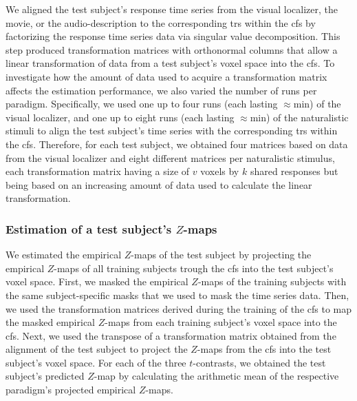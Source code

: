 
%
We aligned the test subject's response time series from the visual localizer,
the movie, or the audio-description to the corresponding \acp{tr} within the
\ac{cfs} by factorizing the response time series data via singular value
decomposition.
%
This step produced transformation matrices with orthonormal columns that allow a
linear transformation of data from a test subject's voxel space into the
\ac{cfs}.
%
To investigate how the amount of data used to acquire a transformation matrix
affects the estimation performance, we also varied the number of runs per
paradigm.
%
Specifically, we used
%
one up to four runs (each lasting $\approx$\unit[5]{min}) of the visual
localizer, and
%
one up to eight runs (each lasting $\approx$\unit[15]{min}) of the naturalistic
stimuli
%
to align the test subject's time series with the corresponding \acp{tr} within
the \ac{cfs}.
%
Therefore, for each test subject, we obtained four matrices based on data from
the visual localizer and eight different matrices per naturalistic stimulus,
each transformation matrix having a size of $v$ voxels by $k$ shared responses
but being based on an increasing amount of data used to calculate the linear
transformation.


\subsubsection{Estimation of a test subject's $Z$-maps}

We estimated the empirical $Z$-maps of the test subject by projecting the
empirical $Z$-maps of all training subjects trough the \ac{cfs} into the test
subject's voxel space.
First, we masked the empirical $Z$-maps of the training subjects with the same
subject-specific masks that we used to mask the time series data.
%
Then, we used the transformation matrices derived during the training of the
\ac{cfs} to map the masked empirical $Z$-maps from each training subject's voxel
space into the \ac{cfs}.
%
Next, we used the transpose of a transformation matrix obtained from the
alignment of the test subject to project the $Z$-maps from the \ac{cfs} into the
test subject's voxel space.
For each of the three $t$-contrasts, we obtained the test subject's predicted
$Z$-map by calculating the arithmetic mean of the respective paradigm's
projected empirical $Z$-maps.


